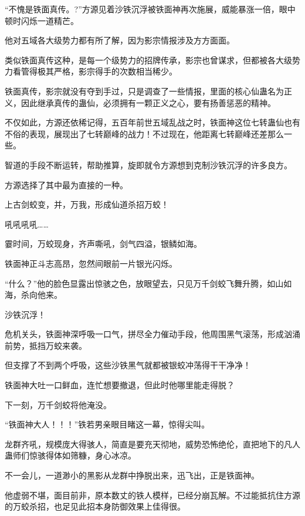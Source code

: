 
\begin{this_body}



“不愧是铁面真传。?”方源见着沙铁沉浮被铁面神再次施展，威能暴涨一倍，眼中顿时闪烁一道精芒。

他对五域各大级势力都有所了解，因为影宗情报涉及方方面面。

类似铁面真传这种，是每一个级势力的招牌传承，影宗也曾谋求，但都被各大级势力看管得极其严格，影宗得手的次数相当稀少。

铁面真传，影宗就没有夺到手过，只是调查了一些情报，里面的核心仙蛊名为正义，因此继承真传的蛊仙，必须拥有一颗正义之心，要有扬善惩恶的精神。

不仅如此，方源还依稀记得，五百年前世五域乱战之时，铁面神这位七转蛊仙也有不俗的表现，展现出了七转巅峰的战力！不过现在，他距离七转巅峰还差那么一些。

智道的手段不断运转，帮助推算，旋即就令方源想到克制沙铁沉浮的许多良方。

方源选择了其中最为直接的一种。

上古剑蛟变，并，万我，形成仙道杀招万蛟！

吼吼吼吼……

霎时间，万蛟现身，齐声嘶吼，剑气四溢，银鳞如海。

铁面神正斗志高昂，忽然间眼前一片银光闪烁。

“什么？”他的脸色显露出惊骇之色，放眼望去，只见万千剑蛟飞舞升腾，如山如海，杀向他来。

沙铁沉浮！

危机关头，铁面神深呼吸一口气，拼尽全力催动手段，他周围黑气滚荡，形成汹涌前势，抵挡万蛟来袭。

但支撑了不到两个呼吸，这些沙铁黑气就都被银蛟冲荡得干干净净！

铁面神大吐一口鲜血，连忙想要撤退，但此时他哪里能走得脱？

下一刻，万千剑蛟将他淹没。

“铁面神大人！！！”铁若男亲眼目睹这一幕，惊得尖叫。

龙群齐吼，规模庞大得骇人，简直是要充天彻地，威势恐怖绝伦，直把地下的凡人蛊师们惊骇得体如筛糠，身心冰凉。

不一会儿，一道渺小的黑影从龙群中挣脱出来，迅飞出，正是铁面神。

他虚弱不堪，面目前非，原本数丈的铁人模样，已经分崩瓦解。不过能抵抗住方源的万蛟杀招，也足见此招本身防御效果上佳得很。


\end{this_body}
